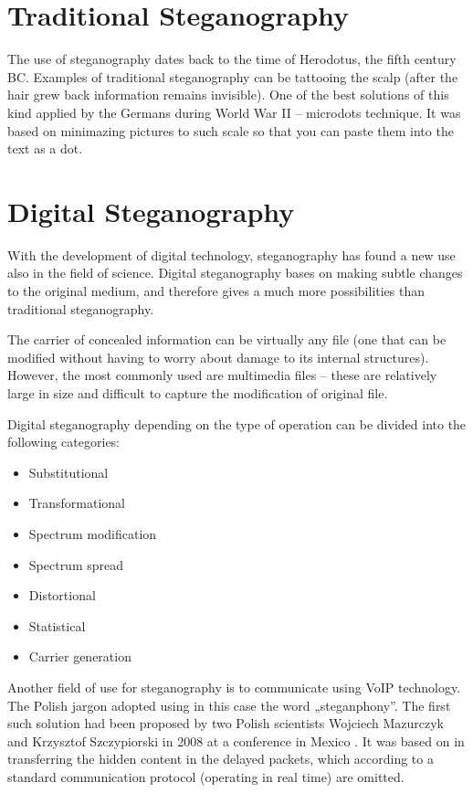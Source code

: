 \documentclass[10pt, a5paper]{article}
\begin{document}
\section{Traditional Steganography}

The use of steganography dates back to the time of Herodotus, the fifth century BC. Examples of traditional steganography can be tattooing the scalp (after the hair grew back information remains invisible). One of the best solutions of this kind applied by the Germans during World War II -- microdots technique. It was based on minimazing  pictures to such scale so that you can paste them into the text as a dot.

\section{Digital Steganography}

With the development of digital technology, steganography has found a new use also in the field of science. Digital steganography bases on making subtle changes to the original medium, and therefore gives a much more possibilities than traditional steganography.

The carrier of concealed information can be virtually any file (one that can be modified without having to worry about damage to its internal structures). However, the most commonly used are multimedia files -- these are relatively large in size and difficult to capture the modification of original file.

Digital steganography depending on the type of operation can be divided into the following categories:

\begin{itemize}
  \item Substitutional
  \item Transformational
  \item Spectrum modification
  \item Spectrum spread
  \item Distortional
  \item Statistical
  \item Carrier generation
\end{itemize}

Another field of use for steganography is to communicate using VoIP technology. The Polish jargon adopted using in this case the word „steganphony”. The first such solution had been proposed by two Polish scientists Wojciech Mazurczyk and Krzysztof Szczypiorski in 2008 at a conference in Mexico \footnotemark[11]. It was based on in transferring the hidden content in the delayed packets, which according to a standard communication protocol (operating in real time) are omitted.
\end{document}

